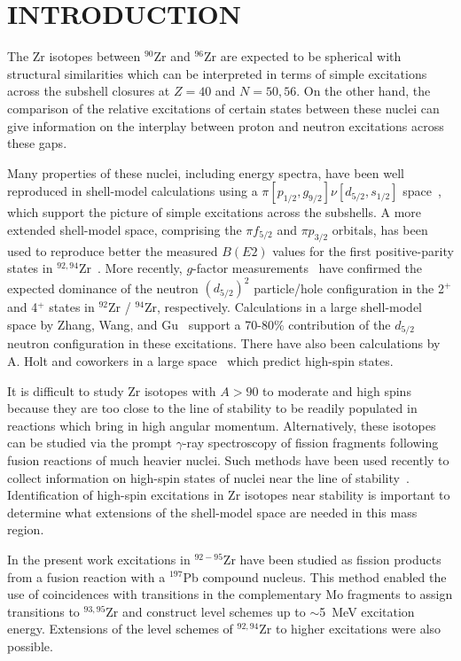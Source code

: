 
\narrowtext

\section{ INTRODUCTION }

The Zr isotopes between $^{90}$Zr and $^{96}$Zr are expected to be 
spherical with structural similarities which can be interpreted in terms of simple
excitations across the subshell closures at $Z=40$ and $N=50,56$. On the other
hand, the comparison of the relative excitations of certain states between these
nuclei can give information on the interplay between proton and neutron 
excitations across these gaps.

 Many properties of these nuclei, including energy spectra, have been
well reproduced in shell-model calculations using a $\pi [ p_{1/2}, g_{9/2} ]
\nu [ d_{5/2}, s_{1/2} ]$ space~\cite{Glo}, which support the picture of simple
excitations across the subshells. A more extended shell-model space, comprising
the $\pi f_{5/2}$ and $\pi p_{3/2}$ orbitals, has been used to reproduce better
the measured $B(E2)$ values for the first positive-parity states in
$^{92,94}$Zr~\cite{Mac}. More recently, $g$-factor measurements~\cite{Jak} 
have confirmed the expected dominance of the neutron
$(d_{5/2})^{2}$ particle/hole configuration in the 2$^+$ and 4$^+$
states in $^{92}$Zr / $^{94}$Zr, respectively. Calculations in a large shell-model 
space by Zhang, Wang, and Gu~\cite{Cha} support a 70-80$\%$ 
contribution of the $d_{5/2}$ neutron configuration in these excitations.
There have also been calculations by A. Holt and coworkers 
in a large space~\cite{holt} which predict high-spin states.  

It is difficult to study Zr isotopes with $A>90$ to moderate
and high spins because they are too close to the line of stability to be readily
populated in reactions which bring in high angular momentum. Alternatively,
these isotopes can be studied via the prompt $\gamma$-ray spectroscopy of
fission fragments following fusion reactions of much heavier nuclei. Such
methods have been used recently to collect information on high-spin
states of nuclei near the line of stability~\cite{Fot}. Identification of
high-spin excitations in Zr isotopes near stability is important to 
determine what extensions of the shell-model space are needed 
in this mass region.

In the present work excitations in $^{92-95}$Zr have been studied as
fission products from a fusion reaction with a $^{197}$Pb compound nucleus.
This method enabled the use of coincidences with transitions in the
complementary Mo fragments to assign transitions to $^{93,95}$Zr and construct
level schemes up to $\sim$5~MeV excitation energy. Extensions of the level
schemes of $^{92,94}$Zr to higher excitations were also possible.

